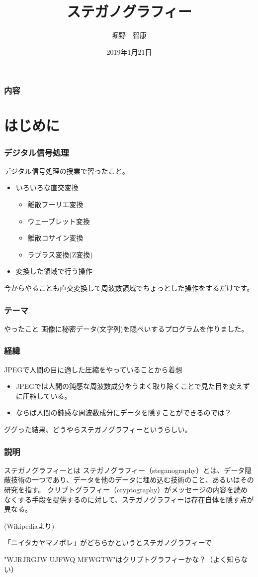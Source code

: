 \documentclass[dvipdfmx,11pt,notheorems]{beamer}
\title[steganograpy]{ステガノグラフィー}%
\author[ayame]{堀野　智康}%
\institute[KMC]{電気電子工学科3回生}%
\date{2019年1月21日}%
\theoremstyle{definition}
\begin{document}
\begin{frame}[plain]\frametitle{}
	\titlepage %
\end{frame}

\begin{frame}\frametitle{内容}
	\tableofcontents %
\end{frame}

\section{はじめに}
\begin{frame}\frametitle{デジタル信号処理}
	デジタル信号処理の授業で習ったこと。
	\begin{itemize}
		\item いろいろな直交変換
		\begin{itemize}
			\item 離散フーリエ変換
			\item ウェーブレット変換
			\item 離散コサイン変換
			\item ラプラス変換(Z変換)
		\end{itemize}
		\item 変換した領域で行う操作
	\end{itemize}

	今からやることも直交変換して周波数領域でちょっとした操作をするだけです。
\end{frame}

\begin{frame}\frametitle{テーマ}
	\begin{block}{やったこと}
		画像に秘密データ(文字列)を隠ぺいするプログラムを作りました。
	\end{block}
\end{frame}

\begin{frame}\frametitle{経緯}
	JPEGで人間の目に適した圧縮をやっていることから着想
	\begin{itemize}
		\item JPEGでは人間の鈍感な周波数成分をうまく取り除くことで見た目を変えずに圧縮している。
		\item ならば人間の鈍感な周波数成分にデータを隠すことができるのでは？
	\end{itemize}
	ググった結果、どうやらステガノグラフィーというらしい。
\end{frame}

\begin{frame}\frametitle{説明}
	\begin{block}{ステガノグラフィーとは}
		ステガノグラフィー（steganography）とは、データ隠蔽技術の一つであり、データを他のデータに埋め込む技術のこと、あるいはその研究を指す。
		クリプトグラフィー（cryptography）がメッセージの内容を読めなくする手段を提供するのに対して、ステガノグラフィーは存在自体を隠す点が異なる。

		(Wikipediaより)
	\end{block}
	「ニイタカヤマノボレ」がどちらかというとステガノグラフィーで

	"WJRJRGJW UJFWQ MFWGTW"はクリプトグラフィーかな？（よく知らない）
\end{frame}
\end{document}

